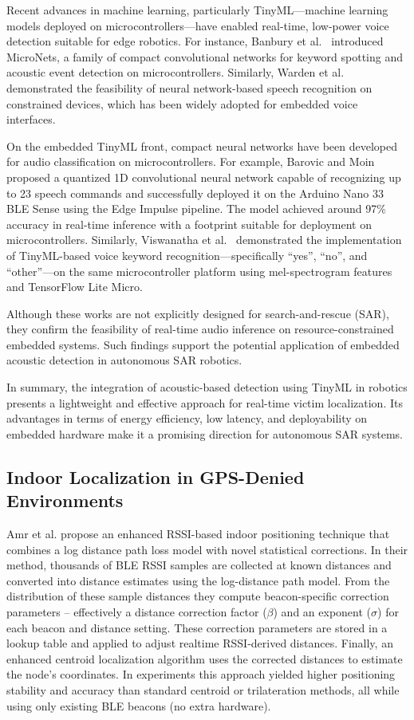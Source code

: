 Recent advances in machine learning, particularly TinyML—machine learning models deployed on microcontrollers—have enabled real-time, low-power voice detection suitable for edge robotics. For instance, Banbury et al.~\cite{Banbury2021micronets} introduced MicroNets, a family of compact convolutional networks for keyword spotting and acoustic event detection on microcontrollers. Similarly, Warden et al.~\cite{Warden2018speech} demonstrated the feasibility of neural network-based speech recognition on constrained devices, which has been widely adopted for embedded voice interfaces.

On the embedded TinyML front, compact neural networks have been developed for audio classification on microcontrollers. For example, Barovic and Moin~\cite{Barovic2025tinyml} proposed a quantized 1D convolutional neural network capable of recognizing up to 23 speech commands and successfully deployed it on the Arduino Nano 33 BLE Sense using the Edge Impulse pipeline. The model achieved around 97\% accuracy in real-time inference with a footprint suitable for deployment on microcontrollers. Similarly, Viswanatha et al.~\cite{Viswanatha2022tinyml} demonstrated the implementation of TinyML-based voice keyword recognition—specifically “yes”, “no”, and “other”—on the same microcontroller platform using mel-spectrogram features and TensorFlow Lite Micro.

Although these works are not explicitly designed for search-and-rescue (SAR), they confirm the feasibility of real-time audio inference on resource-constrained embedded systems. Such findings support the potential application of embedded acoustic detection in autonomous SAR robotics.

In summary, the integration of acoustic-based detection using TinyML in robotics presents a lightweight and effective approach for real-time victim localization. Its advantages in terms of energy efficiency, low latency, and deployability on embedded hardware make it a promising direction for autonomous SAR systems.

\subsection{Indoor Localization in GPS-Denied Environments}
Amr et al. \cite{nagah2021enhanced} propose an enhanced RSSI-based indoor positioning technique that combines a log
distance path loss model with novel statistical corrections. In their method, thousands of BLE RSSI samples are collected at known distances and converted into distance estimates using the log-distance path model. From the distribution of these sample distances they compute beacon-specific correction parameters – effectively a distance correction factor ($\beta$) and an exponent ($\sigma$) for each beacon and distance setting. These correction parameters are stored in a lookup table and applied to adjust realtime RSSI-derived distances. Finally, an enhanced centroid localization algorithm uses the corrected distances to estimate the node’s coordinates. In experiments this approach yielded higher positioning stability and accuracy than standard centroid or trilateration methods, all while using only existing BLE beacons (no extra hardware). 

